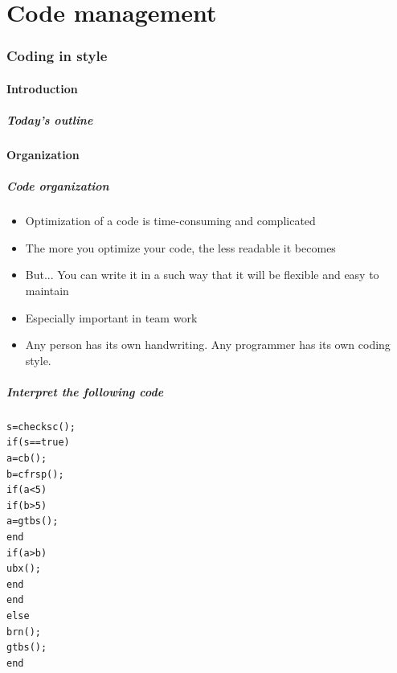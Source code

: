 \documentclass[11pt,table,final,fleqn,xcolor={usenames,dvipsnames},unknownkeysallowed,handout]{beamer}
\begin{document}
\part{Code management}
\frame{\partpage}
\section{Coding in style}
\subsection*{Introduction}
\begin{frame}[label=contents]
  \frametitle{Today's outline}
\end{frame}


\subsection*{Organization}
\begin{frame}
\frametitle{Code organization}
  \begin{itemize}
    \item Optimization of a code is time-consuming and complicated
    \item The more you optimize your code, the less readable it becomes
    \item But... You can write it in a such way that it will be flexible and easy to maintain
    \item Especially important in team work
    \item Any person has its own handwriting. Any programmer has its own coding style.
\end{itemize}

\end{frame}

\begin{frame}[fragile]
 \frametitle{Interpret the following code}
 \begin{lstlisting}
s=checksc();
if(s==true)
a=cb();
b=cfrsp();
if(a<5)
if(b>5)
a=gtbs();
end
if(a>b)
ubx();
end
end
else
brn();
gtbs();
end
 \end{lstlisting}
\end{frame}
\end{document}
